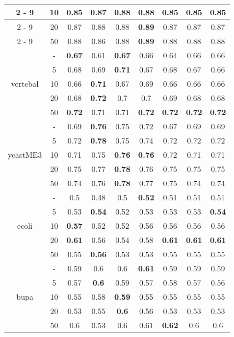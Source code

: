 \documentclass{article}%
\begin{document}
\begin{longtable}{c|c|ccccccc}
\cline{2%
-%
9}%
&10&0.85&0.87&\textbf{0.88}&\textbf{0.88}&0.85&0.85&0.85\\%
\cline{2%
-%
9}%
&20&0.87&0.88&0.88&\textbf{0.89}&0.87&0.87&0.87\\%
\cline{2%
-%
9}%
&50&0.88&0.86&0.88&\textbf{0.89}&0.88&0.88&0.88\\%
\hline%
\multirow{5}{*}{vertebal}&{-}&\textbf{0.67}&0.61&\textbf{0.67}&0.66&0.64&0.66&0.66\\%
\cline{2%
-%
9}%
&5&0.68&0.69&\textbf{0.71}&0.67&0.68&0.67&0.66\\%
\cline{2%
-%
9}%
&10&0.66&\textbf{0.71}&0.67&0.69&0.66&0.66&0.66\\%
\cline{2%
-%
9}%
&20&0.68&\textbf{0.72}&0.7&0.7&0.69&0.68&0.68\\%
\cline{2%
-%
9}%
&50&\textbf{0.72}&0.71&0.71&\textbf{0.72}&\textbf{0.72}&\textbf{0.72}&\textbf{0.72}\\%
\hline%
\multirow{5}{*}{yeastME3}&{-}&0.69&\textbf{0.76}&0.75&0.72&0.67&0.69&0.69\\%
\cline{2%
-%
9}%
&5&0.72&\textbf{0.78}&0.75&0.74&0.72&0.72&0.72\\%
\cline{2%
-%
9}%
&10&0.71&0.75&\textbf{0.76}&\textbf{0.76}&0.72&0.71&0.71\\%
\cline{2%
-%
9}%
&20&0.75&0.77&\textbf{0.78}&0.76&0.75&0.75&0.75\\%
\cline{2%
-%
9}%
&50&0.74&0.76&\textbf{0.78}&0.77&0.75&0.74&0.74\\%
\hline%
\multirow{5}{*}{ecoli}&{-}&0.5&0.48&0.5&\textbf{0.52}&0.51&0.51&0.51\\%
\cline{2%
-%
9}%
&5&0.53&\textbf{0.54}&0.52&0.53&0.53&0.53&\textbf{0.54}\\%
\cline{2%
-%
9}%
&10&\textbf{0.57}&0.52&0.52&0.56&0.56&0.56&0.56\\%
\cline{2%
-%
9}%
&20&\textbf{0.61}&0.56&0.54&0.58&\textbf{0.61}&\textbf{0.61}&\textbf{0.61}\\%
\cline{2%
-%
9}%
&50&0.55&\textbf{0.56}&0.53&0.53&0.55&0.55&0.55\\%
\hline%
\multirow{5}{*}{bupa}&{-}&0.59&0.6&0.6&\textbf{0.61}&0.59&0.59&0.59\\%
\cline{2%
-%
9}%
&5&0.57&\textbf{0.6}&0.59&0.57&0.58&0.57&0.56\\%
\cline{2%
-%
9}%
&10&0.55&0.58&\textbf{0.59}&0.55&0.55&0.55&0.55\\%
\cline{2%
-%
9}%
&20&0.53&0.55&\textbf{0.6}&0.56&0.53&0.53&0.53\\%
\cline{2%
-%
9}%
&50&0.6&0.53&0.6&0.61&\textbf{0.62}&0.6&0.6\\%

\end{longtable}
\end{document}
